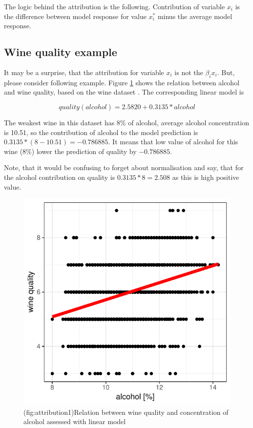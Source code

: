 \documentclass[]{book}
\theoremstyle{definition}
\theoremstyle{definition}
\theoremstyle{definition}
\theoremstyle{remark}
\begin{document}
The logic behind the attribution is the following. Contribution of
variable \(x_i\) is the difference between model response for value
\(x_i^*\) minus the average model response.

\hypertarget{wine-quality-example}{%
\subsection{Wine quality example}\label{wine-quality-example}}

It may be a surprise, that the attribution for variable \(x_i\) is not
the \(\beta_i x_i\). But, please consider following example. Figure
\ref{fig:attribution1} shows the relation between alcohol and wine
quality, based on the wine dataset \citep{wine2009}. The corresponding
linear model is

\[
quality(alcohol) = 2.5820 + 0.3135 * alcohol
\]

The weakest wine in this dataset has 8\% of alcohol, average alcohol
concentration is 10.51, so the contribution of alcohol to the model
prediction is \(0.3135 *(8-10.51) = -0.786885\). It means that low value
of alcohol for this wine (8\%) lower the prediction of quality by
\(-0.786885\).

Note, that it would be confusing to forget about normalisation and say,
that for the alcohol contribution on quality is \(0.3135*8 = 2.508\) as
this is high positive value.

\begin{figure}

{\centering \includegraphics[width=0.5\linewidth]{figure/attribution_1} 

}

\caption{(fig:attribution1)Relation between wine quality and concentration of alcohol assessed with linear model}\label{fig:attribution1}
\end{figure}
\end{document}
